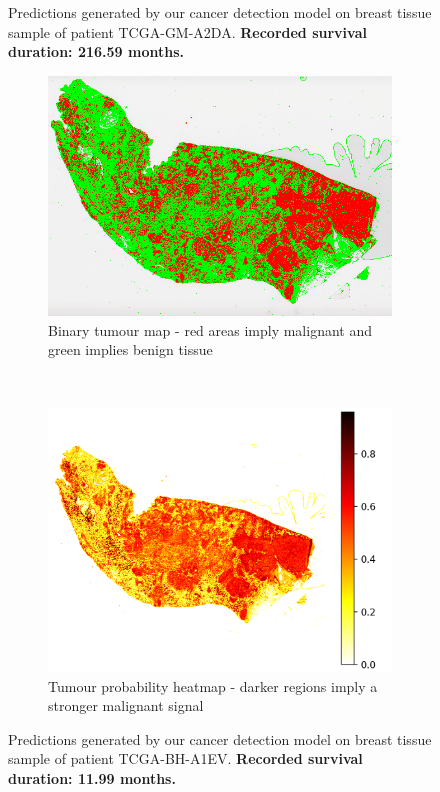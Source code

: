 \documentclass{l4proj}
\begin{document}
\begin{appendices}
\begin{figure}[hbt!]
    \caption{Predictions generated by our cancer detection model on breast tissue sample of patient TCGA-GM-A2DA. \textbf{Recorded survival duration: 216.59 months.}}
    \label{fig:TCGA-GM-A2DA}
\end{figure}

\begin{figure}[hbt!]
    \centering
    \begin{subfigure}[b]{0.4\textwidth}
        \includegraphics[scale=0.4]{images/appendix_b/TCGA-BH-A1EV-mss.png}
        \vspace{0.5cm}
        \caption{Binary tumour map - red areas imply malignant and green implies benign tissue}
    \end{subfigure}\hfill%
    ~~
    \begin{subfigure}[b]{0.4\textwidth}
        \includegraphics[scale=0.6]{images/appendix_b/TCGA-BH-A1EV-mmi.png}
        \caption{Tumour probability heatmap - darker regions imply a stronger malignant signal}
    \end{subfigure}
    \vspace{1cm}
    \caption{Predictions generated by our cancer detection model on breast tissue sample of patient TCGA-BH-A1EV. \textbf{Recorded survival duration: 11.99 months.}}
    \label{fig:TCGA-BH-A1EV}
\end{figure}


\end{appendices}
\end{document}
